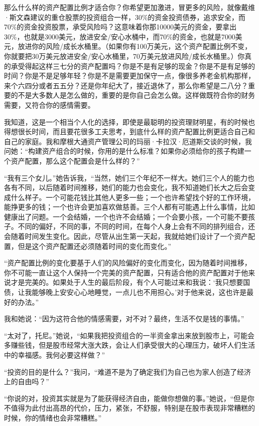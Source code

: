 那么什么样的资产配置比例才适合你？你希望更加激进，冒更多的风险，就像戴维·斯文森建议的重仓股票的投资组合一样，30\%的资金投资债券，追求安全，而70\%的资金投资股票，承受风险吗？这意味着你那10000美元的资金，要拿出30\%，也就是3000美元，放进安全/安心水桶中，而70\%的资金，也就是7000美元，放进你的风险/成长水桶里。（如果你有100万美元，这个资产配置比例不变，你就要把30万美元放进安全/安心水桶里，70万美元放进风险/成长水桶里。）你真的承受得起这样三七分的资产配置吗？你是不是有足够的现金？你是不是有足够的时间？你是不是足够年轻？你是不是需要更加保守一点，像很多养老金机构那样，来个六四分或者五五分？还是你年纪大了，接近退休了，那么你希望是二八分？重要的不是大多数人是怎么做的，重要的是你自己会怎么做。这样做既符合你的财务需要，又符合你的感情需要。

我知道，这是一个相当个人化的选择，即使是最聪明的投资理财明星，有的时候也得想很长时间，而且要花很多工夫思考，到底什么样的资产配置比例更适合自己和自己的家庭。我和摩根大通资产管理公司的玛丽·卡拉汉·厄道斯交谈的时候，我问她：“构建资产组合的时候，你用的是什么标准？如果你必须给你的孩子构建一个资产配置，那么这个配置会是什么样的？”

“我有三个女儿。”她告诉我，“当然，她们三个年纪不一样大。她们三个人的能力也各有不同，以后随着时间推移，她们的能力也会变化，我不知道她们长大之后会变成什么样子。一个可能花钱比其他人更多一些；一个也许希望找个好的工作环境，能挣更多的钱；一个也许会更加喜欢做慈善。三个人都有可能遇上什么事情，比如健康出了问题。一个会结婚，一个也许不会结婚；一个会要小孩，一个可能不要孩子。不同的偏好，不同的事，不同的时间，在每个人身上会有不同的排列组合，还会随着时间发生变化。因此，尽管从出生第一天起，我就给她们设计了一个资产配置，但是这个资产配置还必须随着时间的变化而变化。”

“资产配置比例的变化要基于人们的风险偏好的变化而变化，因为随着时间推移，你不可能一直让这个人保持一个完美的资产配置，只有适合他的资产配置对于他来说才是完美的。如果处于人生的最后阶段，有个人可能过来和我说：‘我只想要国债，让我能够晚上安安心心地睡觉，一点儿也不用担心。’对于他来说，这也许是最好的办法。”

我和她说：“因为这符合他的情感需要，对不对？最终，生活不仅是钱的事情。”

“太对了，托尼。”她说，“如果我把投资组合的一半资金拿出来放到股市上，可能会多赚些钱，但是股市经常大涨大跌，会让人们承受很大的心理压力，破坏人们生活中的幸福感。我何必要这样做？”

“投资的目的是什么？”我问，“难道不是为了确定我们为自己也为家人创造了经济上的自由吗？”

“你说的对，投资其实就是为了能获得经济自由，能做你想做的事。”她说，“但是你不值得为此付出高昂的代价，压力，紧张，不舒服，特别是在股市表现非常糟糕的时候，你的情绪也会非常糟糕。”

